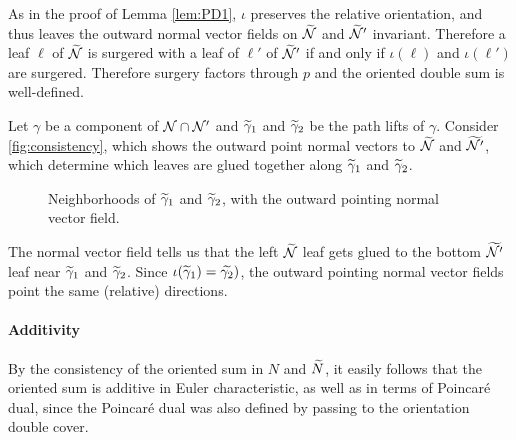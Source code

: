 As in the proof of Lemma \ref{lem:PD1}, $\iota$ preserves the relative orientation, and thus leaves the outward normal vector fields on $\widetilde{\mathcal{N}}$ and $\widetilde{\mathcal{N}}'$ invariant.
Therefore a leaf $\ell$ of $\widetilde{\mathcal{N}}$ is surgered with a leaf of $\ell'$ of $\widetilde{\mathcal{N}}'$ if and only if $\iota(\ell)$ and $\iota(\ell')$ are surgered.
Therefore surgery factors through $p$ and the oriented double sum is well-defined.

\begin{example}
  Let $\gamma$ be a component of $\mathcal{N}\cap \mathcal{N}'$ and $\widetilde{\gamma}_1$ and $\widetilde{\gamma}_2$ be the path lifts of $\gamma$.
  Consider \autoref{fig:consistency}, which shows the outward point normal vectors to $\widetilde{\mathcal{N}}$ and $\widetilde{\mathcal{N}'}$, which determine which leaves are glued together along $\widetilde{\gamma}_1$ and $\widetilde{\gamma}_2$.

\begin{figure}
  \centering
  \caption{Neighborhoods of $\widetilde{\gamma}_1$ and $\widetilde{\gamma}_2$, with the outward pointing normal vector field.}
  \label{fig:consistency}
\end{figure}

The normal vector field tells us that the left $\widetilde{\mathcal{N}}$ leaf gets glued to the bottom $\widetilde{\mathcal{N}'}$ leaf near $\widetilde{\gamma}_1$ and $\widetilde{\gamma}_2$.
Since $\iota(\widetilde{\gamma}_1)=\widetilde{\gamma_2})$, the outward pointing normal vector fields point the same (relative) directions.
\end{example}

\paragraph{Additivity}

By the consistency of the oriented sum in $N$ and $\widetilde{N}$, it easily follows that the oriented sum is additive in Euler characteristic, as well as in terms of Poincar\'e dual, since the Poincar\'e dual was also defined by passing to the orientation double cover.
